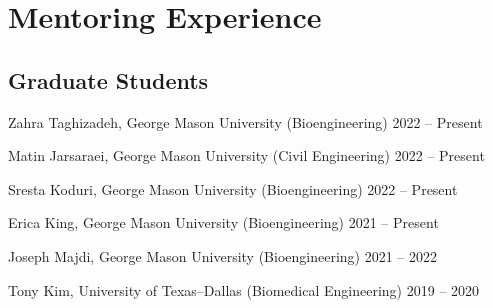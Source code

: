 \documentclass[letterpaper, 10pt]{article}
\begin{document}
\section{Mentoring Experience}

\subsection{\textbf{Graduate Students}}
\begin{compacthang}
     \item Zahra Taghizadeh, George Mason University (Bioengineering) \hfill 2022 -- Present
	\item Matin Jarsaraei, George Mason University (Civil Engineering) \hfill 2022 -- Present
	\item Sresta Koduri, George Mason University (Bioengineering) \hfill 2022 -- Present
	\item Erica King, George Mason University (Bioengineering) \hfill 2021 -- Present
	\item Joseph Majdi, George Mason University (Bioengineering) \hfill 2021 -- 2022
	\item Tony Kim, University of Texas--Dallas (Biomedical Engineering) \hfill 2019 -- 2020
\end{compacthang}
\end{document}
